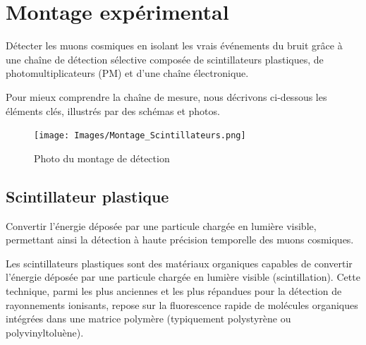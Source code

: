 \documentclass[a4paper,12pt,twoside]{article}
\begin{document}
\newpage

\section{Montage expérimental}


\vspace{1em}
\begin{center}
\begin{tcolorbox}[colback=blue!5!white, colframe=blue!60!black, title=Principe du montage expérimental]
Détecter les muons cosmiques en isolant les vrais événements du bruit grâce à une chaîne de détection sélective composée de scintillateurs plastiques, de photomultiplicateurs (PM) et d’une chaîne électronique.
\end{tcolorbox}
\end{center}

Pour mieux comprendre la chaîne de mesure, nous décrivons ci-dessous les éléments clés, illustrés par des schémas et photos.

\begin{figure}[H]
  \centering
  \texttt{[image: Images/Montage\_Scintillateurs.png]}
  \caption{Photo du montage de détection}
  \label{fig:setup}
\end{figure}

\newpage

\subsection{Scintillateur plastique}


\vspace{1em}
\begin{center}
\begin{tcolorbox}[colback=blue!5!white, colframe=blue!60!black, title=Principe du scintillateur plastique]
Convertir l’énergie déposée par une particule chargée en lumière visible, permettant ainsi la détection à haute précision temporelle des muons cosmiques.
\end{tcolorbox}
\end{center}


Les scintillateurs plastiques sont des matériaux organiques capables de convertir l'énergie déposée par une particule chargée en lumière visible (scintillation). Cette technique, parmi les plus anciennes et les plus répandues pour la détection de rayonnements ionisants, repose sur la fluorescence rapide de molécules organiques intégrées dans une matrice polymère (typiquement polystyrène ou polyvinyltoluène).
\end{document}
